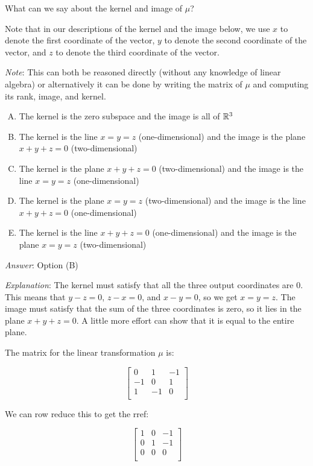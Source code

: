 \documentclass[10pt]{amsart}
\begin{document}
\begin{enumerate}
  What can we say about the kernel and image of $\mu$?

  Note that in our descriptions of the kernel and the image below, we
  use $x$ to denote the first coordinate of the vector, $y$ to denote
  the second coordinate of the vector, and $z$ to denote the third
  coordinate of the vector.

  {\em Note}: This can both be reasoned directly (without any
  knowledge of linear algebra) or alternatively it can be done by
  writing the matrix of $\mu$ and computing its rank, image, and
  kernel.

  \begin{enumerate}[(A)]
  \item The kernel is the zero subspace and the image is all of $\mathbb{R}^3$
  \item The kernel is the line $x = y = z$ (one-dimensional) and the
    image is the plane $x + y + z = 0$ (two-dimensional)
  \item The kernel is the plane $x + y + z = 0$ (two-dimensional) and
    the image is the line $x = y = z$ (one-dimensional)
  \item The kernel is the plane $x = y = z$ (two-dimensional) and the
    image is the line $x + y + z = 0$ (one-dimensional)
  \item The kernel is the line $x + y + z = 0$ (one-dimensional) and
    the image is the plane $x = y = z$ (two-dimensional)
  \end{enumerate}

  {\em Answer}: Option (B)

  {\em Explanation}: The kernel must satisfy that all the three output
  coordinates are $0$. This means that $y - z = 0$, $z - x = 0$, and
  $x - y = 0$, so we get $x = y = z$. The image must satisfy that the
  sum of the three coordinates is zero, so it lies in the plane $x + y
  + z = 0$. A little more effort can show that it is equal to the
  entire plane.

  The matrix for the linear transformation $\mu$ is:

  $$\left[\begin{matrix} 0 & 1 & -1 \\ -1 & 0 & 1 \\ 1 & -1 & 0 \\\end{matrix}\right]$$

  We can row reduce this to get the rref:

  $$\left[\begin{matrix} 1 & 0 & -1 \\ 0 & 1 & -1 \\ 0 & 0 & 0 \\\end{matrix}\right]$$


\end{enumerate}
\end{document}
